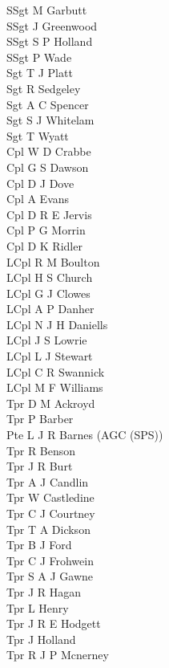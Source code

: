 \begin{multicols}{2}
  \noindent
  SSgt M Garbutt \\
  SSgt J Greenwood \\
  SSgt S P Holland \\
  SSgt P Wade \\
  Sgt T J Platt \\
  Sgt R Sedgeley \\
  Sgt A C Spencer \\
  Sgt S J Whitelam \\
  Sgt T Wyatt \\
  Cpl W D Crabbe \\
  Cpl G S Dawson \\
  Cpl D J Dove \\
  Cpl A Evans \\
  Cpl D R E Jervis \\
  Cpl P G Morrin \\
  Cpl D K Ridler \\
  LCpl R M Boulton \\
  LCpl H S Church \\
  LCpl G J Clowes \\
  LCpl A P Danher \\
  LCpl N J H Daniells \\
  LCpl J S Lowrie \\
  LCpl L J Stewart \\
  LCpl C R Swannick \\
  LCpl M F Williams \\
  Tpr D M Ackroyd \\
  Tpr P Barber \\
  Pte L J R Barnes (AGC (SPS)) \\
  Tpr R Benson \\
  Tpr J R Burt \\
  Tpr A J Candlin \\
  Tpr W Castledine \\
  Tpr C J Courtney \\
  Tpr T A Dickson \\
  Tpr B J Ford \\
  Tpr C J Frohwein \\
  Tpr S A J Gawne \\
  Tpr J R Hagan \\
  Tpr L Henry \\
  Tpr J R E Hodgett \\
  Tpr J Holland \\
  Tpr R J P Mcnerney \\

\end{multicols}
